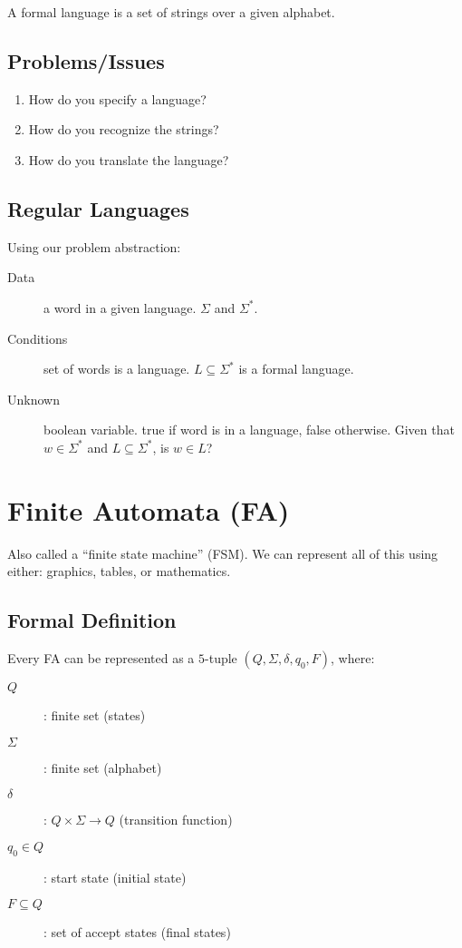 \documentclass{article}
\begin{document}
A formal language is a set of strings over a given alphabet.

\subsection*{Problems/Issues}

\begin{enumerate}
\item How do you specify a language?
\item How do you recognize the strings?
\item How do you translate the language?
\end{enumerate}

\subsection*{Regular Languages}

Using our problem abstraction:

\begin{description}
\item[Data] a word in a given language. $\Sigma$ and $\Sigma^*$.
\item[Conditions] set of words is a language. $L\subseteq\Sigma^*$ is
  a formal language.
\item[Unknown] boolean variable. true if word is in a language, false
  otherwise. Given that $w\in\Sigma^*$ and $L\subseteq\Sigma^*$, is
  $w\in{}L$?
\end{description}

\section*{Finite Automata (FA)}

Also called a ``finite state machine'' (FSM). We can represent all of
this using either: graphics, tables, or mathematics.

\subsection*{Formal Definition}

Every FA can be represented as a $5$-tuple $(Q,\Sigma,\delta,q_0,F)$,
where:

\begin{description}
\item[$Q$]: finite set (states)
\item[$\Sigma$]: finite set (alphabet)
\item[$\delta$]: $Q\times\Sigma\rightarrow{}Q$ (transition function)
\item[$q_0\in{}Q$]: start state (initial state)
\item[$F\subseteq{}Q$]: set of accept states (final states)
\end{description}
\end{document}
